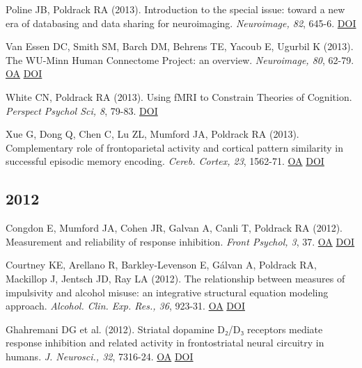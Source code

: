 Poline JB, Poldrack RA (2013). Introduction to the special issue: toward a new era of databasing and data sharing for neuroimaging. \textit{Neuroimage, 82}, 645-6. \href{http://dx.doi.org/10.1016/j.neuroimage.2013.08.044}{DOI} \vspace{2mm}

Van Essen DC, Smith SM, Barch DM, Behrens TE, Yacoub E, Ugurbil K (2013). The WU-Minn Human Connectome Project: an overview. \textit{Neuroimage, 80}, 62-79. \href{https://www.ncbi.nlm.nih.gov/pmc/articles/PMC3724347}{OA} \href{http://dx.doi.org/10.1016/j.neuroimage.2013.05.041}{DOI} \vspace{2mm}

White CN, Poldrack RA (2013). Using fMRI to Constrain Theories of Cognition. \textit{Perspect Psychol Sci, 8}, 79-83. \href{http://dx.doi.org/10.1177/1745691612469029}{DOI} \vspace{2mm}

Xue G, Dong Q, Chen C, Lu ZL, Mumford JA, Poldrack RA (2013). Complementary role of frontoparietal activity and cortical pattern similarity in successful episodic memory encoding. \textit{Cereb. Cortex, 23}, 1562-71. \href{https://www.ncbi.nlm.nih.gov/pmc/articles/PMC3726068}{OA} \href{http://dx.doi.org/10.1093/cercor/bhs143}{DOI} \vspace{2mm}

\subsection*{2012}

Congdon E, Mumford JA, Cohen JR, Galvan A, Canli T, Poldrack RA (2012). Measurement and reliability of response inhibition. \textit{Front Psychol, 3}, 37. \href{https://www.ncbi.nlm.nih.gov/pmc/articles/PMC3283117}{OA} \href{http://dx.doi.org/10.3389/fpsyg.2012.00037}{DOI} \vspace{2mm}

Courtney KE, Arellano R, Barkley-Levenson E, Gálvan A, Poldrack RA, Mackillop J, Jentsch JD, Ray LA (2012). The relationship between measures of impulsivity and alcohol misuse: an integrative structural equation modeling approach. \textit{Alcohol. Clin. Exp. Res., 36}, 923-31. \href{https://www.ncbi.nlm.nih.gov/pmc/articles/PMC3291799}{OA} \href{http://dx.doi.org/10.1111/j.1530-0277.2011.01635.x}{DOI} \vspace{2mm}

Ghahremani DG et al. (2012). Striatal dopamine D₂/D₃ receptors mediate response inhibition and related activity in frontostriatal neural circuitry in humans. \textit{J. Neurosci., 32}, 7316-24. \href{https://www.ncbi.nlm.nih.gov/pmc/articles/PMC3517177}{OA} \href{http://dx.doi.org/10.1523/jneurosci.4284-11.2012}{DOI} \vspace{2mm}

